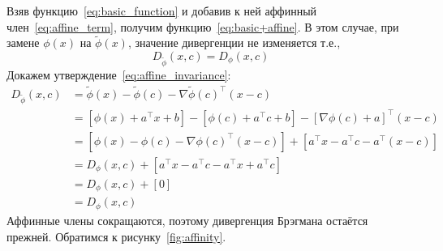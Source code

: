 \documentclass[12pt]{scrartcl}
\begin{document}
Взяв функцию~\ref{eq:basic_function} и добавив к ней аффинный член~\ref{eq:affine_term}, получим функцию~\ref{eq:basic+affine}. В этом случае, при замене $\phi (x)$ на $\tilde{\phi}(x)$, значение дивергенции не изменяется т.е.,
\begin{equation}\label{eq:affine_invariance}
    D_{\tilde{\phi}}(x,c) = D_{\phi}(x,c)
\end{equation}
Докажем утверждение~\ref{eq:affine_invariance}:
\begin{align*}
    D_{\tilde{\phi}}(x, c) &= \tilde{\phi}(x) - \tilde{\phi}(c) - \nabla \tilde{\phi}(c)^\top (x - c) \\
    &= [\phi(x) + a^\top x + b] - [\phi(c) + a^\top c + b] - [\nabla \phi(c) + a]^\top (x - c) \\
    &= [\phi(x) - \phi(c) - \nabla \phi(c)^\top (x - c)] + [a^\top x - a^\top c - a^\top(x - c)] \\
    &= D_{\phi}(x, c) + [a^\top x - a^\top c - a^\top x + a^\top c] \\
    &= D_{\phi}(x, c) + [0] \\
    &= D_{\phi}(x, c)
\end{align*}
Аффинные члены сокращаются, поэтому дивергенция Брэгмана остаётся прежней. Обратимся к рисунку~\ref{fig:affinity}.
\end{document}
